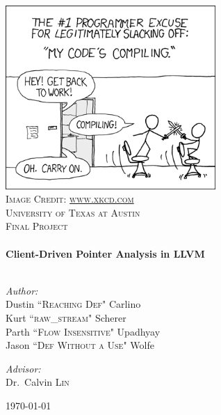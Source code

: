 \begin{titlepage}

\begin{center}


\includegraphics[width=0.60\textwidth]{images/xkcd_comic_2}\\
\textsc{Image Credit: \url{www.xkcd.com}}\\[1cm]    

\textsc{\LARGE University of Texas at Austin}\\[1.0cm]

\textsc{\Large Final Project}\\[0.5cm]


\HRule \\[0.4cm]
{ \huge \bfseries Client-Driven Pointer Analysis in LLVM }\\

\HRule \\[1.5cm]

\begin{minipage}{0.5\textwidth}
\begin{flushleft} \normalsize
\emph{Author:}\\
Dustin \textsc{``Reaching Def"} Carlino\\
Kurt \textsc{``raw\_stream"} Scherer\\
Parth \textsc{``Flow Insensitive"} Upadhyay\\
Jason \textsc{``Def Without a Use"} Wolfe
\end{flushleft}
\end{minipage}
\begin{minipage}{0.4\textwidth}
\begin{flushright} \large
\emph{Advisor:} \\
Dr.~Calvin \textsc{Lin}
\end{flushright}
\end{minipage}

\vfill

{\large \today}

\end{center}

\end{titlepage}
